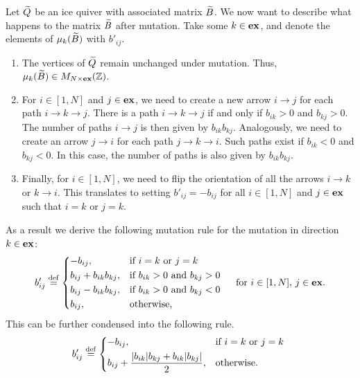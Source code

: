 Let $\widetilde{Q}$ be an ice quiver with associated matrix $\widetilde{B}$. We now want to describe what
happens to the matrix $\widetilde{B}$ after mutation. Take some $k \in \mathbf{ex}$, and denote the
elements of $\mu_k(\widetilde{B})$ with $b'_{ij}$.
\begin{enumerate}
	\item The vertices of $\widetilde{Q}$ remain unchanged under mutation. Thus, $\mu_k(\widetilde{B}) \in M_{N
				      \times \mathbf{ex}}(\mathbb{Z})$.
	\item For $i \in [1, N]$ and $j \in \mathbf{ex}$, we need to create a new arrow $i \to j$ for each
	      path $i \to k \to j$. There is a path $i \to k \to j$ if and only if $b_{ik} >0$ and
	      $b_{kj} > 0$. The number of paths $i\to j$ is then given by $b_{ik}b_{kj}$.
	      Analogously, we need to create an arrow $j \to i$ for each path $j \to k \to i$. Such
	      paths exist if $b_{ik} <0$ and $b_{kj} < 0$. In this case, the number of paths is also
	      given by $b_{ik}b_{kj}$.
	\item Finally, for $i \in [1,N]$, we need to flip the orientation of all the arrows $i \to k$
	      or $k \to i$. This translates to setting $b'_{ij} = -b_{ij}$ for all $i \in [1, N]$ and
	      $j \in \mathbf{ex}$ such that $i = k$ or $j = k$.
\end{enumerate}
As a result we derive the following mutation rule for the mutation in direction $k\in \mathbf{ex}$:
\begin{equation}\label{eq:mutation_rule_matrix_expanded}
	b'_{ij} \defeq \begin{dcases*}
		-b_{ij},               & if $i = k$ or $j = k$        \\
		b_{ij} + b_{ik}b_{kj}, & if $b_{ik}>0$ and $b_{kj} > 0$ \\
		b_{ij} - b_{ik}b_{kj}, & if $b_{ik}>0$ and $b_{kj} < 0$ \\
		b_{ij},                & otherwise,
	\end{dcases*}
	\quad \text{for } i \in [1, N],\,j \in \ex.
\end{equation}
%
This can be further condensed into the following rule.
\begin{equation}\label{eq:mutation_rule_matrix_condensed}
	b'_{ij} \defeq \begin{dcases*}
		-b_{ij},                                            & if $i = k$ or $j = k$ \\
		b_{ij} + \frac{|b_{ik}|b_{kj} + b_{ik}|b_{kj}|}{2}, & otherwise.
	\end{dcases*}
\end{equation}


